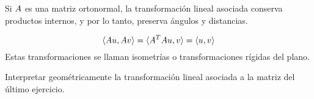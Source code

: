 \begin{prop} Si $\Ab$ es una matriz ortonormal, la transformación lineal asociada conserva productos internos, y por lo tanto, preserva ángulos y distancias.

$$
\langle \Ab\ub, \Ab\vb \rangle = \langle \Ab^T \Ab \ub, \vb \rangle = \langle \ub, \vb \rangle
$$ Estas transformaciones se llaman isometrías o transformaciones rígidas del plano.
\end{prop}

\begin{ejercicio}
Interpretar geométricamente la transformación lineal asociada a la matriz del último ejercicio.

\end{ejercicio}


